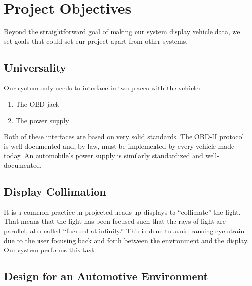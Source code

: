 \section{Project Objectives}

Beyond the straightforward goal of making our system display vehicle data, we
set goals that could set our project apart from other systems.

\subsection{Universality}

Our system only needs to interface in two places with the vehicle:

\begin{enumerate}

\item The OBD jack
\item The power supply

\end{enumerate}

Both of these interfaces are based on very solid standards. The OBD-II protocol
is well-documented and, by law, must be implemented by every vehicle made
today. An automobile's power supply is similarly standardized and
well-documented.

\subsection{Display Collimation}

It is a common practice in projected heads-up displays to ``collimate'' the
light. That means that the light has been focused such that the rays of light
are parallel, also called ``focused at infinity.'' This is done to avoid
causing eye strain due to the user focusing back and forth between the
environment and the display. Our system performs this task.

\subsection{Design for an Automotive Environment}